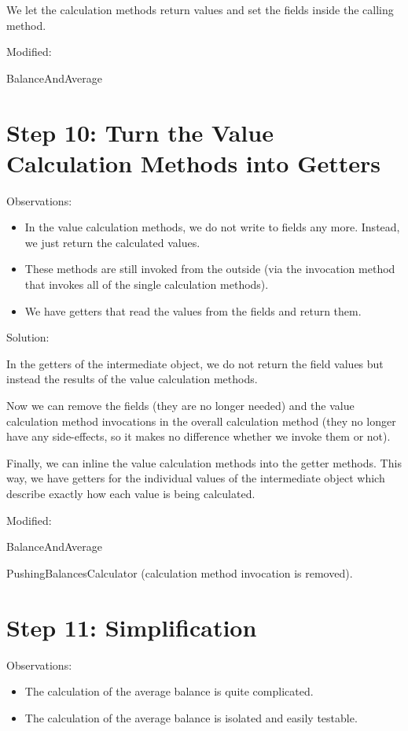 \documentclass[a4paper,fleqn,titlepage,11pt]{article}
\begin{document}
We let the calculation methods return values and set the fields inside the calling method.

Modified:

BalanceAndAverage

\section*{Step 10: Turn the Value Calculation Methods into Getters}

Observations:
\begin{itemize}
\item In the value calculation methods, we do not write to fields any more. Instead, we just return the calculated values.
\item These methods are still invoked from the outside (via the invocation method that invokes all of the single calculation methods).
\item We have getters that read the values from the fields and return them.
\end{itemize}

Solution:

In the getters of the intermediate object, we do not return the field values but instead the results of the value calculation methods.

Now we can remove the fields (they are no longer needed) and the value calculation method invocations in the overall calculation method (they no longer have any side-effects, so it makes no difference whether we invoke them or not).

Finally, we can inline the value calculation methods into the getter methods. This way, we have getters for the individual values of the intermediate object which describe exactly how each value is being calculated.

Modified:

BalanceAndAverage

PushingBalancesCalculator (calculation method invocation is removed).

\section*{Step 11: Simplification}

Observations:
\begin{itemize}
\item The calculation of the average balance is quite complicated.
\item The calculation of the average balance is isolated and easily testable.
\end{itemize}
\end{document}
